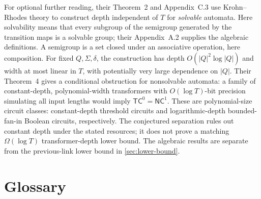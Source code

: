 \documentclass[11pt,twoside]{article}
\theoremstyle{definition}
\theoremstyle{remark}
\begin{document}
For optional further reading, their Theorem~2 and Appendix~C.3 use
Krohn--Rhodes theory to construct depth independent of \(T\) for
\emph{solvable} automata. Here solvability means that every subgroup of
the semigroup generated by the transition maps is a solvable group;
their Appendix~A.2 supplies the algebraic definitions. A semigroup is a
set closed under an associative operation, here composition.
For fixed \(Q,\Sigma,\delta\), the construction has depth
\(O(|Q|^2\log |Q|)\) and width at most linear in \(T\), with potentially
very large dependence on \(|Q|\). Their Theorem~4 gives a conditional
obstruction for nonsolvable automata: a family of constant-depth,
polynomial-width transformers with \(O(\log T)\)-bit precision simulating
all input lengths would imply \(\mathsf{TC}^0=\mathsf{NC}^1\).
These are polynomial-size circuit classes: constant-depth threshold
circuits and logarithmic-depth bounded-fan-in Boolean circuits,
respectively. The conjectured separation rules out constant depth under
the stated resources; it does not prove a matching
\(\Omega(\log T)\) transformer-depth lower bound. The algebraic results
are separate from the previous-link lower bound in \cref{sec:lower-bound}.

\section*{Glossary}
\end{document}
